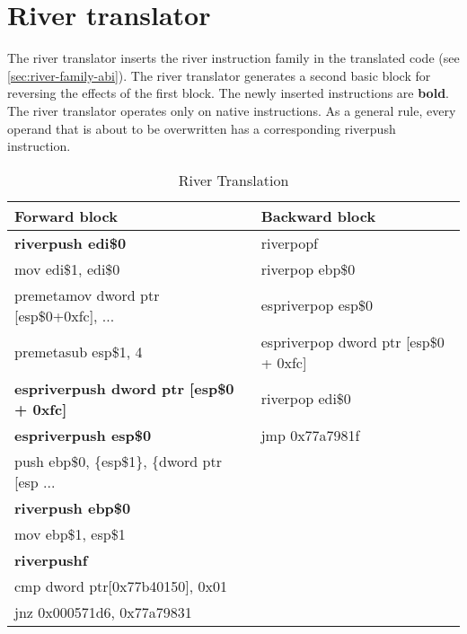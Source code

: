 \documentclass[12pt]{report}
\begin{document}
\section{River translator}
\label{sec:river-translator}
The river translator inserts the river instruction family in the translated code (see \autoref{sec:river-family-abi}). The river translator generates a second basic block for reversing the effects of the first block. The newly inserted instructions are \textbf{bold}. The river translator operates only on native instructions. As a general rule, every operand that is about to be overwritten has a corresponding riverpush instruction.\\
\begin{table}[H]
	\begin{tabular}{| l | l |}
		\hline
		\textbf{Forward block} & \textbf{Backward block}\\ \hline
		\textbf{riverpush edi\$0} & riverpopf\\
		mov edi\$1, edi\$0 & riverpop ebp\$0\\
		premetamov dword ptr [esp\$0+0xfc], ... & espriverpop esp\$0\\
		premetasub esp\$1, 4 & espriverpop dword ptr [esp\$0 + 0xfc]\\
		\textbf{espriverpush dword ptr [esp\$0 + 0xfc]} & riverpop edi\$0\\
		\textbf{espriverpush esp\$0} & jmp 0x77a7981f\\
		push ebp\$0, \{esp\$1\}, \{dword ptr [esp ... & \\
		\textbf{riverpush ebp\$0} & \\
		mov ebp\$1, esp\$1 & \\
		\textbf{riverpushf} & \\
		cmp dword ptr[0x77b40150], 0x01 & \\
		jnz 0x000571d6, 0x77a79831 & \\ \hline
	\end{tabular}
	\caption{River Translation}
\end{table}
\end{document}
